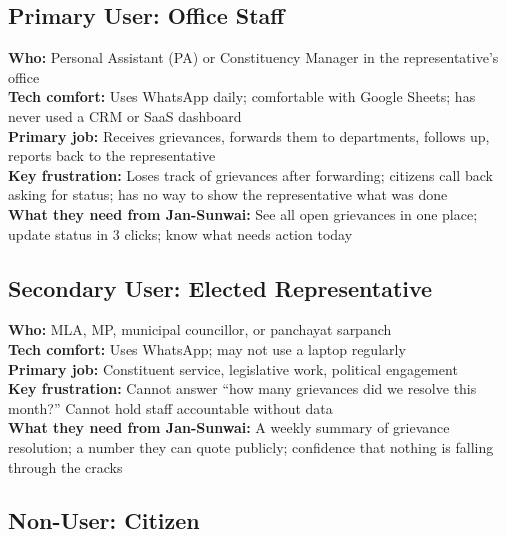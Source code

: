 \documentclass[11pt, a4paper]{article}
\begin{document}
\subsection{Primary User: Office Staff}

\begin{tcolorbox}[colback=lightgray, colframe=pollityblue, sharp corners]
\textbf{Who:} Personal Assistant (PA) or Constituency Manager in the representative's office \\[0.3em]
\textbf{Tech comfort:} Uses WhatsApp daily; comfortable with Google Sheets; has never used a CRM or SaaS dashboard \\[0.3em]
\textbf{Primary job:} Receives grievances, forwards them to departments, follows up, reports back to the representative \\[0.3em]
\textbf{Key frustration:} Loses track of grievances after forwarding; citizens call back asking for status; has no way to show the representative what was done \\[0.3em]
\textbf{What they need from Jan-Sunwai:} See all open grievances in one place; update status in 3 clicks; know what needs action today
\end{tcolorbox}

\subsection{Secondary User: Elected Representative}

\begin{tcolorbox}[colback=lightgray, colframe=pollityblue, sharp corners]
\textbf{Who:} MLA, MP, municipal councillor, or panchayat sarpanch \\[0.3em]
\textbf{Tech comfort:} Uses WhatsApp; may not use a laptop regularly \\[0.3em]
\textbf{Primary job:} Constituent service, legislative work, political engagement \\[0.3em]
\textbf{Key frustration:} Cannot answer ``how many grievances did we resolve this month?'' Cannot hold staff accountable without data \\[0.3em]
\textbf{What they need from Jan-Sunwai:} A weekly summary of grievance resolution; a number they can quote publicly; confidence that nothing is falling through the cracks
\end{tcolorbox}

\subsection{Non-User: Citizen}
\end{document}

